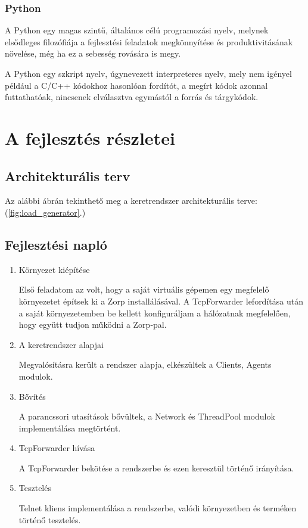\documentclass[a4paper,12pt,oneside]{report}
\begin{document}
\subsubsection{Python \cite{book:python}}


A Python egy magas szintű, általános célú programozási nyelv, melynek elsődleges filozófiája a fejlesztési feladatok megkönnyítése és produktivitásának növelése, még ha ez a sebesség rovására is megy.

A Python egy szkript nyelv, úgynevezett interpreteres nyelv, mely nem igényel például a C/C++ kódokhoz hasonlóan fordítót, a megírt kódok azonnal futtathatóak, nincsenek elválasztva egymástól a forrás és tárgykódok.

\section{A fejlesztés részletei}

\subsection{Architekturális terv}

Az alábbi ábrán tekinthető meg a keretrendszer architekturális terve: (\ref{fig:load_generator}.)

\subsection{Fejlesztési napló}
\begin{enumerate}
    \itemsep0em
        \item Környezet kiépítése
        
            Első feladatom az volt, hogy a saját virtuális gépemen egy megfelelő környezetet építsek ki a Zorp installálásával. A TcpForwarder lefordítása után a saját környezetemben be kellett konfiguráljam a hálózatnak megfelelően, hogy együtt tudjon működni a Zorp-pal.
            
        \item A keretrendszer alapjai
        
        Megvalósításra került a rendszer alapja, elkészültek a Clients, Agents modulok.
        
        \item Bővítés
        
        A parancssori utasítások bővültek, a Network és ThreadPool modulok implementálása megtörtént.
        
        \item TcpForwarder hívása
        
        A TcpForwarder bekötése a rendszerbe és ezen keresztül történő irányítása.
        
        \item Tesztelés
        
        Telnet kliens implementálása a rendszerbe, valódi környezetben és terméken történő tesztelés.
        
\end{enumerate}
\end{document}
